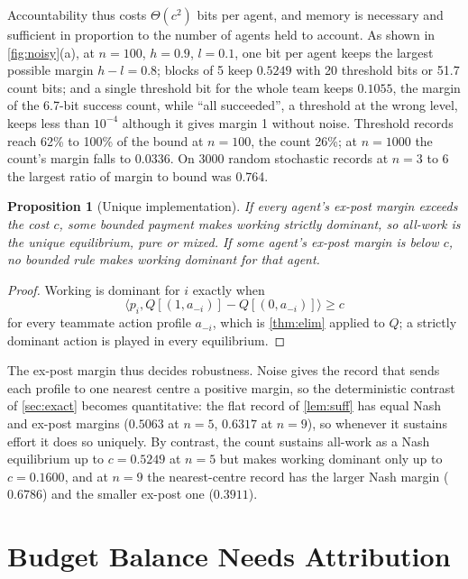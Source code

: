 \documentclass[sigconf,anonymous,acmthm=false]{aamas}
\theoremstyle{acmplain}
\newtheorem{proposition}{Proposition}
\theoremstyle{acmdefinition}
\begin{document}
Accountability thus costs $\Theta(c^2)$ bits per agent, and memory is necessary and sufficient
in proportion to the number of agents held to account. As shown in \cref{fig:noisy}(a), at
$n=100$, $h=0.9$, $l=0.1$, one bit per agent keeps the largest possible margin $h-l=0.8$;
blocks of 5 keep $0.5249$ with 20 threshold bits or 51.7 count bits; and a single threshold
bit for the whole team keeps $0.1055$, the margin of the 6.7-bit success count, while ``all
succeeded'', a threshold at the wrong level, keeps less than $10^{-4}$ although it gives
margin 1 without noise. Threshold records reach 62\% to 100\% of the bound at $n=100$, the
count 26\%; at $n=1000$ the count's margin falls to $0.0336$. On 3000 random stochastic
records at $n=3$ to 6 the largest ratio of margin to bound was 0.764.

\begin{proposition}[Unique implementation]\label{prop:unique}
If every agent's ex-post margin exceeds the cost $c$, some bounded payment makes working
strictly dominant, so all-work is the unique equilibrium, pure or mixed. If some agent's
ex-post margin is below $c$, no bounded rule makes working dominant for that agent.
\end{proposition}
\begin{proof}
Working is dominant for $i$ exactly when
\[ \langle p_i,Q[(1,a_{-i})]-Q[(0,a_{-i})]\rangle\ge c \]
for every teammate action profile $a_{-i}$, which is \cref{thm:elim} applied to $Q$; a strictly dominant action is played in
every equilibrium.
\end{proof}

The ex-post margin thus decides robustness. Noise gives the record that sends each profile to
one nearest centre a positive margin, so the deterministic contrast of \cref{sec:exact}
becomes quantitative: the flat record of \cref{lem:suff} has equal Nash and ex-post margins
($0.5063$ at $n=5$, $0.6317$ at $n=9$), so whenever it sustains effort it does so uniquely.
By contrast, the count sustains all-work as a Nash equilibrium up to $c=0.5249$ at $n=5$ but
makes working dominant only up to $c=0.1600$, and at $n=9$ the nearest-centre record has
the larger Nash margin ($0.6786$) and the smaller ex-post one ($0.3911$).

\section{Budget Balance Needs Attribution}\label{sec:bb}
\end{document}
